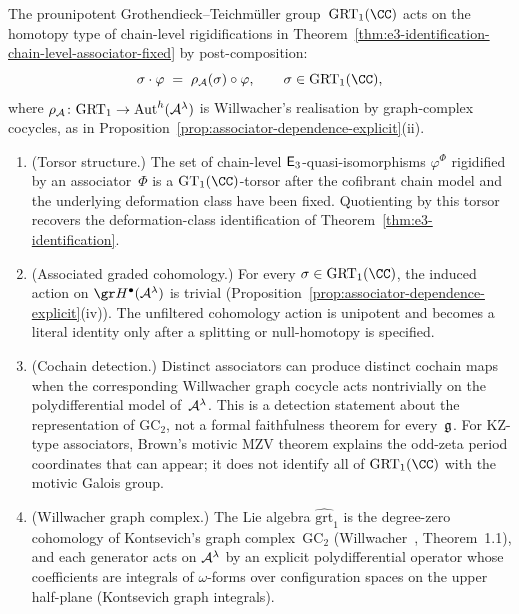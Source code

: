 \begin{remark}
\label{rem:grt1-action-on-identification}
The prounipotent Grothendieck--Teichm\"uller group~$\GRT_1(\CC)$
acts on the homotopy type of chain-level rigidifications in
Theorem~\ref{thm:e3-identification-chain-level-associator-fixed}
by post-composition:
\[
 \sigma \cdot \varphi
 \;=\;
 \rho_{\cA}(\sigma) \circ \varphi,
 \qquad
 \sigma \in \GRT_1(\CC),
\]
where $\rho_{\mathcal{A}} \colon \mathrm{GRT}_1 \to \operatorname{Aut}^h(\mathcal{A}^\lambda)$ is
Willwacher's realisation by graph-complex cocycles, as in
Proposition~\ref{prop:associator-dependence-explicit}(ii).

\begin{enumerate}[label=\textup{(\roman*)}]
\item \textup{(Torsor structure.)}
The set of chain-level $\mathsf{E}_3$-quasi-isomorphisms
$\varphi^\Phi$ rigidified by an associator~$\Phi$ is a
$\GT_1(\CC)$-torsor after the cofibrant chain model and the
underlying deformation class have been fixed. Quotienting by this
torsor recovers the deformation-class identification of
Theorem~\ref{thm:e3-identification}.

\item \textup{(Associated graded cohomology.)}
For every $\sigma \in \GRT_1(\CC)$, the induced action on
$\gr H^\bullet(\cA^\lambda)$ is trivial
(Proposition~\ref{prop:associator-dependence-explicit}(iv)).
The unfiltered cohomology action is unipotent and becomes a literal
identity only after a splitting or null-homotopy is specified.

\item \textup{(Cochain detection.)}
Distinct associators can produce distinct cochain maps when the
corresponding Willwacher graph cocycle acts nontrivially on the
polydifferential model of~$\mathcal{A}^\lambda$. This is a detection
statement about the representation of $\mathrm{GC}_2$, not a
formal faithfulness theorem for every~$\mathfrak{g}$.
For KZ-type associators, Brown's motivic MZV theorem
\cite{Brown12} explains the odd-zeta period coordinates that can
appear; it does not identify all of $\GRT_1(\CC)$ with the motivic
Galois group.

\item \textup{(Willwacher graph complex.)}
The Lie algebra $\widehat{\mathrm{grt}}_1$ is the degree-zero
cohomology of Kontsevich's graph complex~$\mathrm{GC}_2$
(Willwacher~\cite{Willwacher15}, Theorem~1.1), and each
generator acts on $\mathcal{A}^\lambda$ by an explicit
polydifferential operator whose coefficients are integrals of
$\omega$-forms over configuration spaces on the upper
half-plane (Kontsevich graph integrals).


\end{enumerate}
\end{remark}
